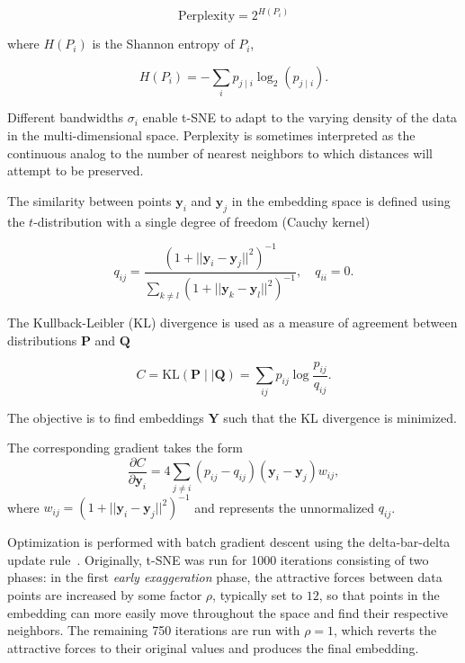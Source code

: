 \documentclass[twocolumn]{bmcart}
\begin{document}
\begin{equation}
\text{Perplexity} = 2^{H(P_i)}
\end{equation}

\noindent where $H(P_i)$ is the Shannon entropy of $P_i$,

\begin{equation}
H(P_i) = -\sum_i p_{j \mid i} \log_2 (p_{j \mid i}).
\end{equation}

\noindent Different bandwidths $\sigma_i$ enable t-SNE to adapt to the varying
density of the data in the multi-dimensional space. Perplexity is sometimes
interpreted as the continuous analog to the number of nearest neighbors to which
distances will attempt to be preserved. 

The similarity between points $\mathbf{y}_i$ and $\mathbf{y}_j$ in the
embedding space is defined using the $t$-distribution with a single degree of
freedom (Cauchy kernel)

\begin{equation}
q_{ij} = \frac{\left ( 1 + || \mathbf{y}_i - \mathbf{y}_j ||^2 \right )^{-1}}
{\sum_{k \neq l}\left ( 1 + || \mathbf{y}_k - \mathbf{y}_l ||^2 \right )^{-1}},
\quad q_{ii} = 0.
\label{eq:cauchy_kernel}
\end{equation}

The Kullback-Leibler (KL) divergence is used as a measure of agreement
between distributions $\mathbf{P}$ and $\mathbf{Q}$

\begin{equation}
C = \text{KL}(\mathbf{P} \mid \mid \mathbf{Q}) = \sum_{ij} p_{ij} \log \frac{p_{ij}}{q_{ij}}.
\label{eq:kl_divergence}
\end{equation}

\noindent The objective is to find embeddings $\mathbf{Y}$ such that the
KL divergence is minimized.

The corresponding gradient takes the form
\begin{equation}
\frac{\partial C}{\partial \mathbf{y}_i} = 4 \sum_{j \neq i} \left ( p_{ij} - q_{ij} \right ) \left ( \mathbf{y}_i - \mathbf{y}_j \right ) w_{ij},
\label{eq:tsne_gradient}
\end{equation}
where $w_{ij} = \left ( 1 + || \mathbf{y}_i - \mathbf{y}_j || ^2 \right )^{-1}$
and represents the unnormalized $q_{ij}$.

Optimization is performed with batch gradient descent using the delta-bar-delta
update rule~\cite{jacobs1988increased}. Originally, t-SNE was run for 1000
iterations consisting of two phases: in the first \textit{early exaggeration}
phase, the attractive forces between data points are increased by some factor
$\rho$, typically set to $12$, so that points in the embedding can more easily move throughout the space and find
their respective neighbors. The remaining 750 iterations are run with $\rho=1$,
which reverts the attractive forces to their original values and produces the
final embedding.
\end{document}
